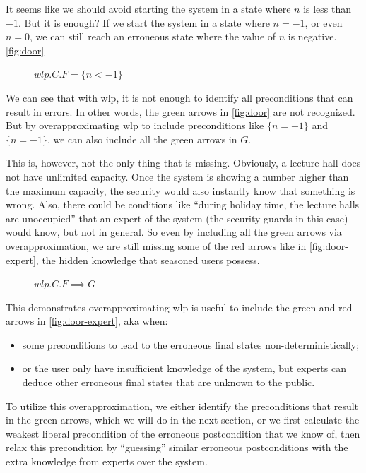 It seems like we should avoid starting the system in a state where $n$ is less than $-1$. 
But it is enough? If we start the system in a state where $n=-1$, or even $n=0$, we can still reach an erroneous state where the value of $n$ is negative. 
\autoref{fig:door}
\begin{figure}[ht]
	\centering
	
	\caption{$wlp.C.F = \{n<-1\}$}
	\label{fig:door}
\end{figure}
We can see that with wlp, it is not enough to identify all preconditions that can result in errors. 
In other words, the green arrows in \autoref{fig:door} are not recognized. 
But by overapproximating wlp to include preconditions like $\{n=-1\}$ and $\{n=-1\}$, we can also include all the green arrows in $G$. 

This is, however, not the only thing that is missing. 
Obviously, a lecture hall does not have unlimited capacity. 
Once the system is showing a number higher than the maximum capacity, the security would also instantly know that something is wrong. 
Also, there could be conditions like ``during holiday time, the lecture halls are unoccupied'' that an expert of the system (the security guards in this case) would know, but not in general. 
So even by including all the green arrows via overapproximation, we are still missing some of the red arrows like in \autoref{fig:door-expert}, the hidden knowledge that seasoned users possess.   
\begin{figure}[ht]
	\centering
	
	\caption{$wlp.C.F \implies G$}
	\label{fig:door-expert}
\end{figure}

This demonstrates overapproximating wlp is useful to include the green and red arrows in \autoref{fig:door-expert}, aka when: 
\begin{itemize}
	\item some preconditions  to lead to the erroneous final states non-deterministically; 
	\item or the user only have insufficient knowledge of the system, but experts can deduce other erroneous final states that are unknown to the public. 
\end{itemize}
To utilize this overapproximation, we either identify the preconditions that result in the green arrows, which we will do in the next section, or we first calculate the weakest liberal precondition of the erroneous postcondition that we know of, then relax this precondition by ``guessing'' similar erroneous postconditions with the extra knowledge from experts over the system. 

